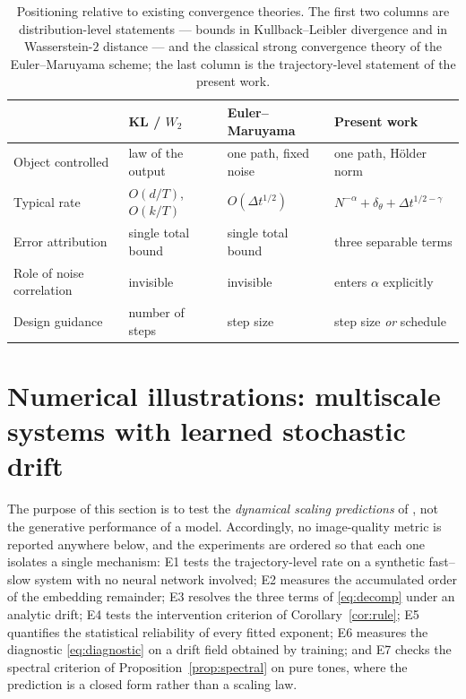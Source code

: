 \documentclass[a4paper,fleqn]{cas-dc}
\theoremstyle{definition}
\begin{document}
\begin{table}[t]
\centering
\caption{Positioning relative to existing convergence theories. The first two
columns are distribution-level statements --- bounds in Kullback--Leibler
divergence and in Wasserstein-$2$ distance --- and the classical strong
convergence theory of the Euler--Maruyama scheme; the last column is the
trajectory-level statement of the present work.}
\label{tab:compare}
\small
\renewcommand{\arraystretch}{1.25}
\begin{tabularx}{\textwidth}{@{}>{\raggedright\arraybackslash}p{2.9cm}XXX@{}}
\toprule
 & KL / $W_{2}$ & Euler--Maruyama & Present work \\
\midrule
Object controlled & law of the output & one path, fixed noise & one path, H\"older norm \\
Typical rate & $O(d/T)$, $O(k/T)$ & $O(\Delta t^{1/2})$ & $N^{-\alpha}+\delta_{\theta}+\Delta t^{1/2-\gamma}$ \\
Error attribution & single total bound & single total bound & three separable terms \\
Role of noise correlation & invisible & invisible & enters $\alpha$ explicitly \\
Design guidance & number of steps & step size & step size \emph{or} schedule \\
\bottomrule
\end{tabularx}
\end{table}

\section{Numerical illustrations: multiscale systems with learned stochastic drift}
\label{sec:numerics}

The purpose of this section is to test the \emph{dynamical scaling predictions} of
, not the generative performance of a model. Accordingly,
no image-quality metric is reported anywhere below, and the experiments are ordered so
that each one isolates a single mechanism: E1 tests the trajectory-level rate on a
synthetic fast--slow system with no neural network involved; E2 measures the
accumulated order of the embedding remainder; E3 resolves the three terms of
\eqref{eq:decomp} under an analytic drift; E4 tests the intervention criterion of
Corollary~\ref{cor:rule}; E5 quantifies the statistical reliability of every fitted exponent;
E6 measures the diagnostic \eqref{eq:diagnostic} on a drift field obtained by
training; and E7 checks the spectral criterion of Proposition~\ref{prop:spectral} on pure tones,
where the prediction is a closed form rather than a scaling law.
\end{document}
